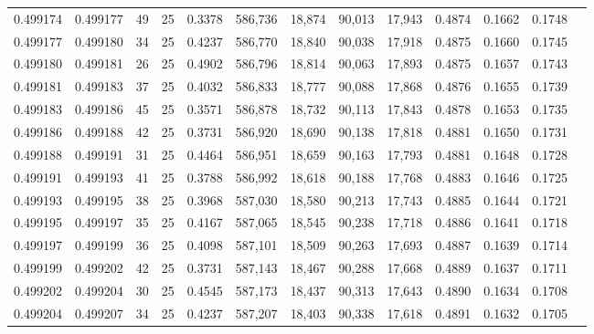 \begin{tabular}{rrrrrrrrrrrrr}
0.499174 & 0.499177 &    49 &  25 &                                     0.3378 & 586,736 &  18,874 &  90,013 &  17,943 & 0.4874 & 0.1662 & 0.1748 \\
0.499177 & 0.499180 &    34 &  25 &                                     0.4237 & 586,770 &  18,840 &  90,038 &  17,918 & 0.4875 & 0.1660 & 0.1745 \\
0.499180 & 0.499181 &    26 &  25 &                                     0.4902 & 586,796 &  18,814 &  90,063 &  17,893 & 0.4875 & 0.1657 & 0.1743 \\
0.499181 & 0.499183 &    37 &  25 &                                     0.4032 & 586,833 &  18,777 &  90,088 &  17,868 & 0.4876 & 0.1655 & 0.1739 \\
0.499183 & 0.499186 &    45 &  25 &                                     0.3571 & 586,878 &  18,732 &  90,113 &  17,843 & 0.4878 & 0.1653 & 0.1735 \\
0.499186 & 0.499188 &    42 &  25 &                                     0.3731 & 586,920 &  18,690 &  90,138 &  17,818 & 0.4881 & 0.1650 & 0.1731 \\
0.499188 & 0.499191 &    31 &  25 &                                     0.4464 & 586,951 &  18,659 &  90,163 &  17,793 & 0.4881 & 0.1648 & 0.1728 \\
0.499191 & 0.499193 &    41 &  25 &                                     0.3788 & 586,992 &  18,618 &  90,188 &  17,768 & 0.4883 & 0.1646 & 0.1725 \\
0.499193 & 0.499195 &    38 &  25 &                                     0.3968 & 587,030 &  18,580 &  90,213 &  17,743 & 0.4885 & 0.1644 & 0.1721 \\
0.499195 & 0.499197 &    35 &  25 &                                     0.4167 & 587,065 &  18,545 &  90,238 &  17,718 & 0.4886 & 0.1641 & 0.1718 \\
0.499197 & 0.499199 &    36 &  25 &                                     0.4098 & 587,101 &  18,509 &  90,263 &  17,693 & 0.4887 & 0.1639 & 0.1714 \\
0.499199 & 0.499202 &    42 &  25 &                                     0.3731 & 587,143 &  18,467 &  90,288 &  17,668 & 0.4889 & 0.1637 & 0.1711 \\
0.499202 & 0.499204 &    30 &  25 &                                     0.4545 & 587,173 &  18,437 &  90,313 &  17,643 & 0.4890 & 0.1634 & 0.1708 \\
0.499204 & 0.499207 &    34 &  25 &                                     0.4237 & 587,207 &  18,403 &  90,338 &  17,618 & 0.4891 & 0.1632 & 0.1705 \\

\end{tabular}
